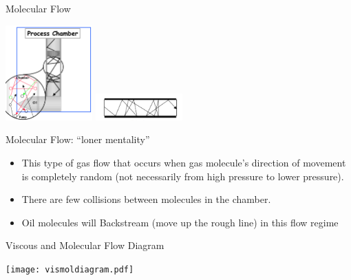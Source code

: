 \documentclass[11]{beamer}
\begin{document}
\begin{frame}{Molecular Flow}

\begin{center}
   			\includegraphics[width=0.25\textwidth]{MolecularFlow.png}
   			\includegraphics[width=0.25\textwidth]{MolecularFlow1.png}
\end{center}





\begin{exampleblock}{Molecular Flow: “loner mentality”}
 
	\begin{itemize}
	\item  This type of gas flow that occurs when gas molecule's direction of movement is completely random (not necessarily from high pressure to lower pressure).
	\item  There are few collisions between molecules in the chamber.
    \item Oil molecules will Backstream (move up the rough line) in this flow regime
	\end{itemize}
	


\end{exampleblock}

		


\end{frame}

\begin{frame}{Viscous and Molecular Flow Diagram}

\begin{center}
   			\texttt{[image: vismoldiagram.pdf]}
   			
\end{center}

\end{frame}
\end{document}
